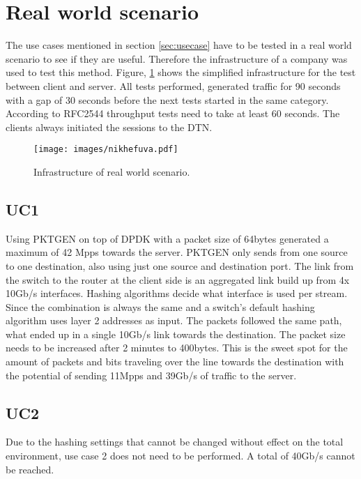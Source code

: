\section{Real world scenario}
The use cases mentioned in section \ref{sec:usecase} have to be tested in a real world scenario to see if they are useful. Therefore the infrastructure of a company was used to test this method.
Figure, \ref{fig:nikhefuva} shows the simplified infrastructure for the test between client and server. All tests performed, generated traffic for 90 seconds with a gap of 30 seconds before the next tests started in the same category. According to RFC2544 \cite{rfc2544} throughput tests need to take at least 60 seconds. The clients always initiated the sessions to the DTN.

\begin{figure}
  \texttt{[image: images/nikhefuva.pdf]}
  \caption{Infrastructure of real world scenario.}
  \label{fig:nikhefuva}
\end{figure}

\subsection{UC1}
Using PKTGEN on top of DPDK with a packet size of 64bytes generated a maximum of 42 Mpps towards the server. PKTGEN only sends from one source to one destination, also using just one source and destination port. The link from the switch to the router at the client side is an aggregated link build up from 4x 10Gb/s interfaces. Hashing algorithms decide what interface is used per stream. Since the combination is always the same and a switch's default hashing algorithm uses layer 2 addresses as input. The packets followed the same path, what ended up in a single 10Gb/s link towards the destination. The packet size needs to be increased after 2 minutes to 400bytes. This is the sweet spot for the amount of packets and bits traveling over the line towards the destination with the potential of sending 11Mpps and 39Gb/s of traffic to the server.  

\subsection{UC2}
Due to the hashing settings that cannot be changed without effect on the total environment, use case 2 does not need to be performed. A total of 40Gb/s cannot be reached.

